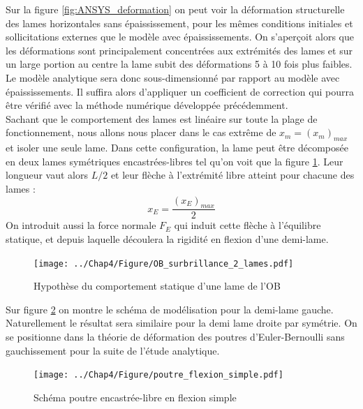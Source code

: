 Sur la figure \ref{fig:ANSYS_deformation} on peut voir la déformation structurelle des lames horizontales sans épaississement, pour les mêmes conditions initiales et sollicitations externes que le modèle avec épaississements. On s'aperçoit alors que les déformations sont principalement concentrées aux extrémités des lames et sur un large portion au centre la lame subit des déformations 5 à 10 fois plus faibles. Le modèle analytique sera donc sous-dimensionné par rapport au modèle avec épaississements. Il suffira alors d'appliquer un coefficient de correction qui pourra être vérifié avec la méthode numérique développée précédemment.\\
	Sachant que le comportement des lames est linéaire sur toute la plage de fonctionnement, nous allons nous placer dans le cas extrême de $x_m = (x_m)_{max}$ et isoler une seule lame. Dans cette configuration, la lame peut être décomposée en deux lames symétriques encastrées-libres tel qu'on voit que la figure \ref{fig:OB_surbrillance_2_lames}. Leur longueur vaut alors $L/2$ et leur flèche à l'extrémité libre atteint pour chacune des lames :
\begin{equation}
		x_E =\frac{(x_E)_{max}}{2}
\label{eq:x_E=x_max/2}
\end{equation}
On introduit aussi la force normale $F_E$ qui induit cette flèche à l'équilibre statique, et depuis laquelle découlera la rigidité en flexion d'une demi-lame.\\
\begin{figure}[!htbp]
\begin{center}
    \captionsetup{justification=centering}
	\texttt{[image: ../Chap4/Figure/OB\_surbrillance\_2\_lames.pdf]}
	\caption{Hypothèse du comportement statique d'une lame de l'OB}
	\label{fig:OB_surbrillance_2_lames}
\end{center}
\end{figure}
Sur figure \ref{fig:poutre_flexion_simple} on montre le schéma de modélisation pour la demi-lame gauche. Naturellement le résultat sera similaire pour la demi lame droite par symétrie. On se positionne dans la théorie de déformation des poutres d'Euler-Bernoulli sans gauchissement pour la suite de l'étude analytique. 
\begin{figure}[!htbp]
\begin{center}
    \captionsetup{justification=centering}
	\texttt{[image: ../Chap4/Figure/poutre\_flexion\_simple.pdf]}
	\caption{Schéma poutre encastrée-libre en flexion simple}
	\label{fig:poutre_flexion_simple}
\end{center}
\end{figure}
